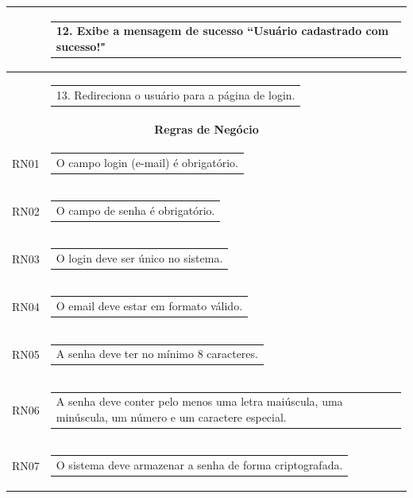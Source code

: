 \begin{longtable}[c]{|p{}|p{}|}
\multicolumn{1}{|p{0.48\textwidth}|}{} &
  \begin{tabular}[c]{@{}p{}@{}}12. Exibe a mensagem de sucesso ``Usuário cadastrado com sucesso!"\end{tabular} \\ \hline
\multicolumn{1}{|p{0.48\textwidth}|}{} &
  \begin{tabular}[c]{@{}p{}@{}}13. Redireciona o usuário para a página de login.\end{tabular} \\ \hline
\multicolumn{2}{|c|}{\textbf{Regras de Negócio}} \\ \hline
\multicolumn{1}{|p{0.48\textwidth}|}{RN01} &
  \begin{tabular}[c]{@{}p{}@{}}O campo login (e-mail) é obrigatório.\end{tabular} \\ \hline
\multicolumn{1}{|p{0.48\textwidth}|}{RN02} &
  \begin{tabular}[c]{@{}p{}@{}}O campo de senha é obrigatório.\end{tabular} \\ \hline
\multicolumn{1}{|p{0.48\textwidth}|}{RN03} &
  \begin{tabular}[c]{@{}p{}@{}}O login deve ser único no sistema.\end{tabular} \\ \hline
\multicolumn{1}{|p{0.48\textwidth}|}{RN04} &
  \begin{tabular}[c]{@{}p{}@{}}O email deve estar em formato válido.\end{tabular} \\ \hline
\multicolumn{1}{|p{0.48\textwidth}|}{RN05} &
  \begin{tabular}[c]{@{}p{}@{}}A senha deve ter no mínimo 8 caracteres.\end{tabular} \\ \hline
\multicolumn{1}{|p{0.48\textwidth}|}{RN06} &
  \begin{tabular}[c]{@{}p{}@{}}A senha deve conter pelo menos uma letra maiúscula, uma minúscula, um número e um caractere especial.\end{tabular} \\ \hline
\multicolumn{1}{|p{0.48\textwidth}|}{RN07} &
  \begin{tabular}[c]{@{}p{}@{}}O sistema deve armazenar a senha de forma criptografada.\end{tabular} \\ \hline

\end{longtable}
